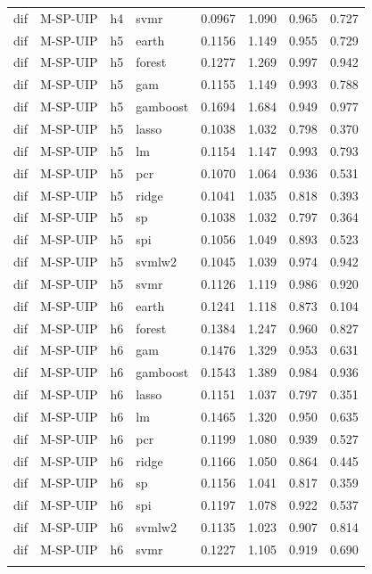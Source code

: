 \begin{ThreePartTable}
\begin{longtable}[t]{llclcccc}
dif & M-SP-UIP & h4 & svmr & 0.0967 & 1.090 & 0.965 & 0.727\\
\addlinespace
dif & M-SP-UIP & h5 & earth & 0.1156 & 1.149 & 0.955 & 0.729\\
dif & M-SP-UIP & h5 & forest & 0.1277 & 1.269 & 0.997 & 0.942\\
dif & M-SP-UIP & h5 & gam & 0.1155 & 1.149 & 0.993 & 0.788\\
dif & M-SP-UIP & h5 & gamboost & 0.1694 & 1.684 & 0.949 & 0.977\\
dif & M-SP-UIP & h5 & lasso & 0.1038 & 1.032 & 0.798 & 0.370\\
dif & M-SP-UIP & h5 & lm & 0.1154 & 1.147 & 0.993 & 0.793\\
dif & M-SP-UIP & h5 & pcr & 0.1070 & 1.064 & 0.936 & 0.531\\
dif & M-SP-UIP & h5 & ridge & 0.1041 & 1.035 & 0.818 & 0.393\\
dif & M-SP-UIP & h5 & sp & 0.1038 & 1.032 & 0.797 & 0.364\\
dif & M-SP-UIP & h5 & spi & 0.1056 & 1.049 & 0.893 & 0.523\\
dif & M-SP-UIP & h5 & svmlw2 & 0.1045 & 1.039 & 0.974 & 0.942\\
dif & M-SP-UIP & h5 & svmr & 0.1126 & 1.119 & 0.986 & 0.920\\
\addlinespace
dif & M-SP-UIP & h6 & earth & 0.1241 & 1.118 & 0.873 & 0.104\\
dif & M-SP-UIP & h6 & forest & 0.1384 & 1.247 & 0.960 & 0.827\\
dif & M-SP-UIP & h6 & gam & 0.1476 & 1.329 & 0.953 & 0.631\\
dif & M-SP-UIP & h6 & gamboost & 0.1543 & 1.389 & 0.984 & 0.936\\
dif & M-SP-UIP & h6 & lasso & 0.1151 & 1.037 & 0.797 & 0.351\\
dif & M-SP-UIP & h6 & lm & 0.1465 & 1.320 & 0.950 & 0.635\\
dif & M-SP-UIP & h6 & pcr & 0.1199 & 1.080 & 0.939 & 0.527\\
dif & M-SP-UIP & h6 & ridge & 0.1166 & 1.050 & 0.864 & 0.445\\
dif & M-SP-UIP & h6 & sp & 0.1156 & 1.041 & 0.817 & 0.359\\
dif & M-SP-UIP & h6 & spi & 0.1197 & 1.078 & 0.922 & 0.537\\
dif & M-SP-UIP & h6 & svmlw2 & 0.1135 & 1.023 & 0.907 & 0.814\\
dif & M-SP-UIP & h6 & svmr & 0.1227 & 1.105 & 0.919 & 0.690\\
\addlinespace

\end{longtable}
\end{ThreePartTable}
